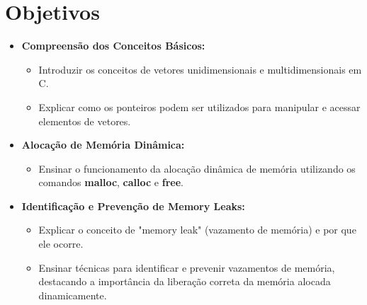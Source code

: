 \section{Objetivos}


\begin{frame}
	\begin{itemize}
	\justifying
	\item \textbf{Compreensão dos Conceitos Básicos:}
	\begin{itemize}
		\item Introduzir os conceitos de vetores unidimensionais e multidimensionais em C.
		\item Explicar como os ponteiros podem ser utilizados para manipular e acessar elementos de vetores.
	\end{itemize}


	\item \textbf{Alocação de Memória Dinâmica:}
	\begin{itemize}
		\item Ensinar o funcionamento da alocação dinâmica de memória utilizando os comandos \textbf{malloc}, \textbf{calloc} e \textbf{free}.
	\end{itemize}

	\item \textbf{Identificação e Prevenção de Memory Leaks:}
	\begin{itemize}
		\item Explicar o conceito de "memory leak" (vazamento de memória) e por que ele ocorre.
		\item Ensinar técnicas para identificar e prevenir vazamentos de memória, destacando a importância da liberação correta da memória alocada dinamicamente.
	
	\end{itemize}	
	
%	
	
	
	
	
	
	\end{itemize}
\end{frame}
